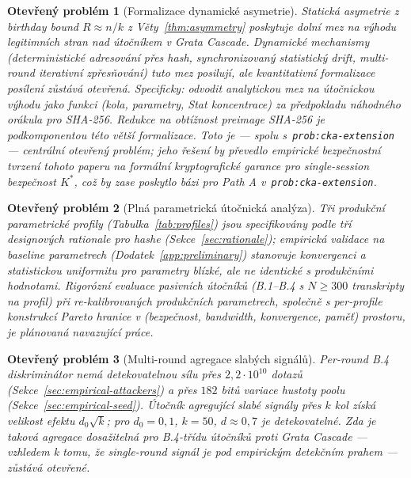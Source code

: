 \documentclass[11pt,a4paper]{article}
\newtheorem{openproblem}{Otev\v{r}en\'y probl\'em}
\begin{document}
\begin{openproblem}[Formalizace dynamické asymetrie]\label{prob:dynamic-formal}
Statická asymetrie z birthday bound $R \approx n/k$ z Věty~\ref{thm:asymmetry} poskytuje dolní mez na výhodu legitimních stran nad útočníkem v Grata Cascade. Dynamické mechanismy (deterministické adresování přes hash, synchronizovaný statistický drift, multi-round iterativní zpřesňování) tuto mez posilují, ale kvantitativní formalizace posílení zůstává otevřená. Specificky: odvodit analytickou mez na útočnickou výhodu jako funkci (kola, parametry, Stat koncentrace) za předpokladu náhodného orákula pro SHA-256. Redukce na obtížnost preimage SHA-256 je podkomponentou této větší formalizace. Toto je --- spolu s~\texttt{prob:cka-extension} --- centrální otevřený problém; jeho řešení by převedlo empirické bezpečnostní tvrzení tohoto paperu na formální kryptografické garance pro single-session bezpečnost $K^*$, což by zase poskytlo bázi pro Path A v~\texttt{prob:cka-extension}.
\end{openproblem}

\begin{openproblem}[Plná parametrická útočnická analýza]\label{prob:parametric}
Tři produkční parametrické profily (Tabulka~\ref{tab:profiles}) jsou specifikovány podle tří designových rationale pro hashe (Sekce~\ref{sec:rationale}); empirická validace na baseline parametrech (Dodatek~\ref{app:preliminary}) stanovuje konvergenci a statistickou uniformitu pro parametry blízké, ale ne identické s produkčními hodnotami. Rigorózní evaluace pasivních útočníků (B.1--B.4 s $N \geq 300$ transkripty na profil) při re-kalibrovaných produkčních parametrech, společně s per-profile konstrukcí Pareto hranice v (bezpečnost, bandwidth, konvergence, paměť) prostoru, je plánovaná navazující práce.
\end{openproblem}

\begin{openproblem}[Multi-round agregace slabých signálů]\label{prob:multiround}
Per-round B.4 diskriminátor nemá detekovatelnou sílu přes $2{,}2 \cdot 10^{10}$ dotazů (Sekce~\ref{sec:empirical-attackers}) a přes $182$ bitů variace hustoty poolu (Sekce~\ref{sec:empirical-seed}). Útočník agregující slabé signály přes $k$ kol získá velikost efektu $d_0 \sqrt{k}$; pro $d_0 = 0{,}1$, $k = 50$, $d \approx 0{,}7$ je detekovatelné. Zda je taková agregace dosažitelná pro B.4-třídu útočníků proti Grata Cascade --- vzhledem k tomu, že single-round signál je pod empirickým detekčním prahem --- zůstává otevřené.
\end{openproblem}
\end{document}
